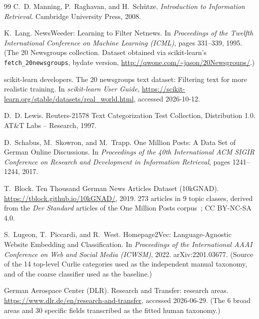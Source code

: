 \begin{thebibliography}{99}
C.~D. Manning, P.~Raghavan, and H.~Sch\"utze.
\newblock \emph{Introduction to Information Retrieval}.
\newblock Cambridge University Press, 2008.

K.~Lang.
\newblock NewsWeeder: Learning to Filter Netnews.
\newblock In \emph{Proceedings of the Twelfth International Conference on Machine Learning
(ICML)}, pages 331--339, 1995.
\newblock (The 20 Newsgroups collection. Dataset obtained via scikit-learn's
\texttt{fetch\_20newsgroups}, bydate version, \url{http://qwone.com/~jason/20Newsgroups/}.)

scikit-learn developers.
\newblock The 20 newsgroups text dataset: Filtering text for more realistic training.
\newblock In \emph{scikit-learn User Guide},
\url{https://scikit-learn.org/stable/datasets/real_world.html}, accessed 2026-10-12.

D.~D. Lewis.
\newblock Reuters-21578 Text Categorization Test Collection, Distribution 1.0.
\newblock AT\&T Labs -- Research, 1997.

D.~Schabus, M.~Skowron, and M.~Trapp.
\newblock One Million Posts: A Data Set of German Online Discussions.
\newblock In \emph{Proceedings of the 40th International ACM SIGIR Conference on Research and
Development in Information Retrieval}, pages 1241--1244, 2017.

T.~Block.
\newblock Ten Thousand German News Articles Dataset (10kGNAD).
\newblock \url{https://tblock.github.io/10kGNAD/}, 2019.
273 articles in 9 topic classes, derived from the \emph{Der Standard} articles of
the One Million Posts corpus~\cite{schabus2017million}; CC BY-NC-SA 4.0.

S.~Lugeon, T.~Piccardi, and R.~West.
\newblock Homepage2Vec: Language-Agnostic Website Embedding and Classification.
\newblock In \emph{Proceedings of the International AAAI Conference on Web and Social Media
(ICWSM)}, 2022. arXiv:2201.03677.
\newblock (Source of the 14 top-level Curlie categories used as the independent manual
taxonomy, and of the coarse classifier used as the baseline.)

German Aerospace Center (DLR).
\newblock Research and Transfer: research areas.
\newblock \url{https://www.dlr.de/en/research-and-transfer}, accessed 2026-06-29.
\newblock (The 6 broad areas and 30 specific fields transcribed as the fitted human taxonomy.)


\end{thebibliography}
